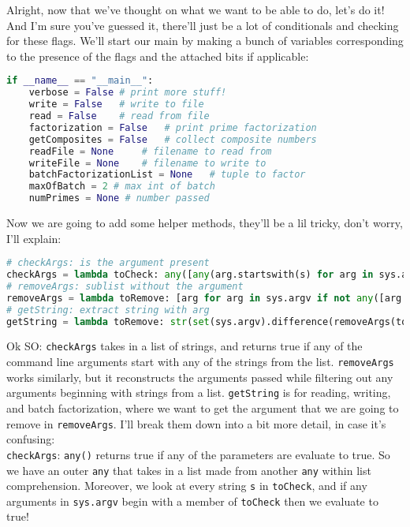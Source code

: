\documentclass[12pt]{article}
\begin{document}
Alright, now that we've thought on what we want to be able to do, let's do it! And I'm sure you've guessed it, there'll just be a lot of conditionals and checking for these flags. We'll start our main by making a bunch of variables corresponding to the presence of the flags and the attached bits if applicable:\\
\begin{lstlisting}[language=Python]
if __name__ == "__main__":
    verbose = False # print more stuff!
    write = False   # write to file
    read = False    # read from file
    factorization = False   # print prime factorization
    getComposites = False   # collect composite numbers
    readFile = None     # filename to read from
    writeFile = None    # filename to write to
    batchFactorizationList = None   # tuple to factor
    maxOfBatch = 2 # max int of batch
    numPrimes = None # number passed
\end{lstlisting}
Now we are going to add some helper methods, they'll be a lil tricky, don't worry, I'll explain:\\
\begin{lstlisting}[language=Python]
# checkArgs: is the argument present
checkArgs = lambda toCheck: any([any(arg.startswith(s) for arg in sys.argv) for s in toCheck])
# removeArgs: sublist without the argument
removeArgs = lambda toRemove: [arg for arg in sys.argv if not any([arg.startswith(s) for s in toRemove])]
# getString: extract string with arg
getString = lambda toRemove: str(set(sys.argv).difference(removeArgs(toRemove)).pop()).split('=', 1)[1]
\end{lstlisting}
Ok SO: \texttt{checkArgs} takes in a list of strings, and returns true if any of the command line arguments start with any of the strings from the list. \texttt{removeArgs} works similarly, but it reconstructs the arguments passed while filtering out any arguments beginning with strings from a list. \texttt{getString} is for reading, writing, and batch factorization, where we want to get the argument that we are going to remove in \texttt{removeArgs}. I'll break them down into a bit more detail, in case it's confusing:\\
\texttt{checkArgs}: \texttt{any()} returns true if any of the parameters are evaluate to true. So we have an outer \texttt{any} that takes in a list made from another \texttt{any} within list comprehension. Moreover, we look at every string \texttt{s} in \texttt{toCheck}, and if any arguments in \texttt{sys.argv} begin with a member of \texttt{toCheck} then we evaluate to true!\\
\end{document}

